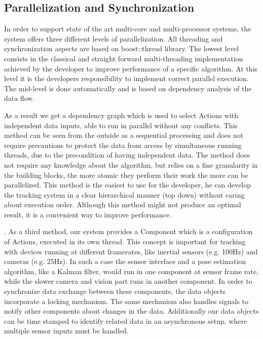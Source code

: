 \documentclass{article}
\begin{document}
\subsection{Parallelization and Synchronization  }
\par In order to support state of the art multi-core and multi-processor systems, the system offers three different levels of parallelization. All threading and synchronization aspects are based on boost::thread library. The lowest level consists in the classical and straight forward multi-threading implementation achieved by the developer to improve performance of a speciﬁc algorithm. At this level it is the developers responsibility to implement correct parallel execution. The mid-level is done automatically and is based on dependency analysis of the data ﬂow. 
\par  As a result we get a dependency graph which is used to select Actions with independent data inputs, able to run in parallel without any conﬂicts. This method can be seen from the outside as a sequential processing and does not require precautions to protect the data from access by simultaneous running threads, due to the precondition of having independent data. The method does not require any knowledge about the algorithm, but relies on a ﬁne granularity in the building blocks, the more atomic they perform their work the more can be parallelized. This method is the easiest to use for the developer, he can develop the tracking system in a clear hierarchical manner (top down) without caring about execution order. Although this method might not produce an optimal result, it is a convenient way to improve performance. 
\par . As a third method, our system provides a Component which is a conﬁguration of Actions, executed in its own thread. This concept is important for tracking with devices running at different framerates, like inertial sensors (e.g. 100Hz) and cameras (e.g. 25Hz). In such a case the sensor interface and a pose estimation algorithm, like a Kalman ﬁlter, would run in one component at sensor frame rate, while the slower camera and vision part runs in another component. In order to synchronize data exchange between these components, the data objects incorporate a locking mechanism. The same mechanism also handles signals to notify other components about changes in the data. Additionally our data objects can be time stamped to identify related data in an asynchronous setup, where multiple sensor inputs must be handled.  
\end{document}
